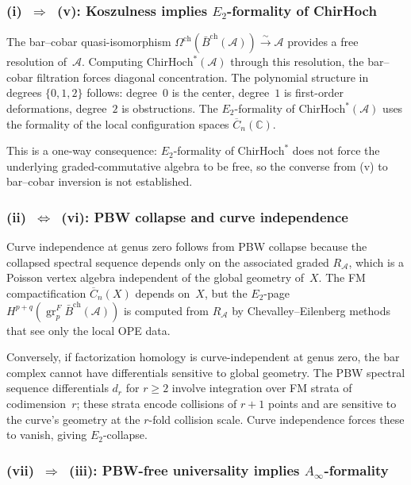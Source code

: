 \documentclass[11pt,reqno]{amsart}
\theoremstyle{definition}
\theoremstyle{remark}
\newcommand{\cA}{\mathcal{A}}
\newcommand{\barBch}{\bar{B}^{\mathrm{ch}}}
\newcommand{\FM}{\overline{C}}
\newcommand{\ChirHoch}{\mathrm{ChirHoch}}
\newcommand{\bC}{\mathbb{C}}
\newcommand{\Etwo}{E_2}
\newcommand{\Ainfty}{A_\infty}
\DeclareMathOperator{\gr}{gr}
\numberwithin{equation}{section}
\begin{document}
\subsubsection*{\textup{(i)}~$\Rightarrow$~\textup{(v):}
Koszulness implies $\Etwo$-formality of ChirHoch}

The bar--cobar quasi-isomorphism
$\Omega^{\mathrm{ch}}(\barBch(\cA)) \xrightarrow{\sim} \cA$
provides a free resolution of~$\cA$. Computing
$\ChirHoch^*(\cA)$ through this resolution, the bar--cobar
filtration forces diagonal concentration. The polynomial
structure in degrees $\{0,1,2\}$ follows: degree~$0$ is the
center, degree~$1$ is first-order deformations, degree~$2$ is
obstructions. The $\Etwo$-formality of $\ChirHoch^*(\cA)$ uses
the formality of the local configuration spaces $\FM_n(\bC)$.

This is a one-way consequence: $\Etwo$-formality of $\ChirHoch^*$
does not force the underlying graded-commutative algebra to be free,
so the converse from (v) to bar--cobar inversion is not established.

\subsubsection*{\textup{(ii)}~$\Leftrightarrow$~\textup{(vi):}
PBW collapse and curve independence}

Curve independence at genus zero follows from PBW collapse because
the collapsed spectral sequence depends only on the associated
graded $R_\cA$, which is a Poisson vertex algebra independent of
the global geometry of~$X$. The FM compactification
$\FM_n(X)$ depends on~$X$, but the $\Etwo$-page
$H^{p+q}(\gr^F_p \barBch(\cA))$ is computed from $R_\cA$ by
Chevalley--Eilenberg methods that see only the local OPE data.

Conversely, if factorization homology is curve-independent at
genus zero, the bar complex cannot have differentials sensitive to
global geometry. The PBW spectral sequence differentials
$d_r$ for $r \geq 2$ involve integration over FM strata of
codimension~$r$; these strata encode collisions of $r+1$ points
and are sensitive to the curve's geometry at the $r$-fold
collision scale. Curve independence forces these to vanish,
giving $\Etwo$-collapse.

\subsubsection*{\textup{(vii)}~$\Rightarrow$~\textup{(iii):}
PBW-free universality implies $\Ainfty$-formality}
\end{document}

